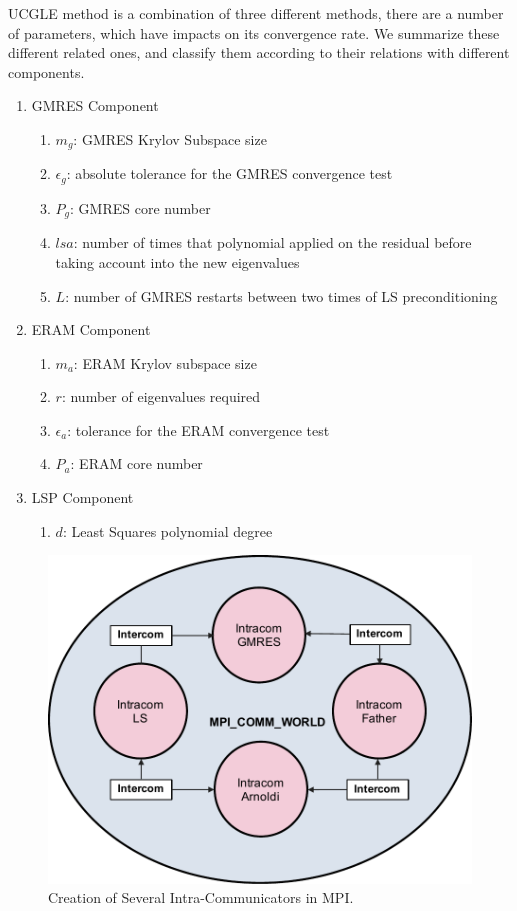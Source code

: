 UCGLE method is a combination of three different methods, there are a number of parameters, which have impacts on its convergence rate. We summarize these different related ones, and classify them according to their relations with different components.

\begin{enumerate}[]
	\item GMRES Component
	\begin{enumerate}[]
		\item $m_g$: GMRES Krylov Subspace size 
		\item $\epsilon_g$: absolute tolerance for  the GMRES convergence test
		\item $P_g$: GMRES core number
		\item $lsa$: number of times that polynomial applied on the residual before taking account into the new eigenvalues
		\item $L$: number of GMRES restarts between two times of LS preconditioning
	\end{enumerate}
	\item ERAM Component
	\begin{enumerate}[]
		\item $m_a$: ERAM Krylov subspace size
		\item $r$: number of eigenvalues required
		\item $\epsilon_a$: tolerance for the ERAM convergence test
		\item $P_a$: ERAM core number
	\end{enumerate}
	\item LSP Component
	\begin{enumerate}[]
		\item $d$: Least Squares polynomial degree
	\end{enumerate}
\end{enumerate}

\begin{figure}[t]
	\centering
	\includegraphics[width=0.72\linewidth]{fig/UCGLE_COMM_WORLD.pdf}
	\caption{Creation of Several Intra-Communicators in MPI.}
	\label{fig:ucgle_comm_world}
\end{figure}

